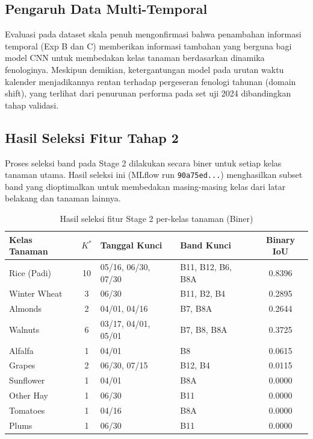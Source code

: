 \subsection{Pengaruh Data Multi-Temporal}

Evaluasi pada dataset skala penuh mengonfirmasi bahwa penambahan informasi temporal (Exp B dan C) 
memberikan informasi tambahan yang berguna bagi model CNN untuk membedakan kelas tanaman 
berdasarkan dinamika fenologinya. Meskipun demikian, ketergantungan model pada urutan waktu 
kalender menjadikannya rentan terhadap pergeseran fenologi tahunan (domain shift), yang 
terlihat dari penurunan performa pada set uji 2024 dibandingkan tahap validasi.

\subsection{Hasil Seleksi Fitur Tahap 2}

Proses seleksi band pada Stage 2 dilakukan secara biner untuk setiap kelas tanaman utama. 
Hasil seleksi ini (MLflow run \texttt{90a75ed...}) menghasilkan subset band yang dioptimalkan 
untuk membedakan masing-masing kelas dari latar belakang dan tanaman lainnya.

\begin{table}[H]
    \centering
    \caption{Hasil seleksi fitur Stage 2 per-kelas tanaman (Biner)}
    \label{tab:stage2_results}
    \begin{tabular}{|l|c|l|l|c|}
    \hline
    \textbf{Kelas Tanaman} & \textbf{$K^*$} & \textbf{Tanggal Kunci} & \textbf{Band Kunci} & \textbf{Binary IoU} \\
    \hline
    Rice (Padi)       & 10 & 05/16, 06/30, 07/30 & B11, B12, B6, B8A & 0.8396 \\
    Winter Wheat      & 3  & 06/30               & B11, B2, B4       & 0.2895 \\
    Almonds           & 2  & 04/01, 04/16        & B7, B8A           & 0.2644 \\
    Walnuts           & 6  & 03/17, 04/01, 05/01 & B7, B8, B8A       & 0.3725 \\
    Alfalfa           & 1  & 04/01               & B8                & 0.0615 \\
    Grapes            & 2  & 06/30, 07/15        & B12, B4           & 0.0115 \\
    Sunflower         & 1  & 04/01               & B8A               & 0.0000 \\
    Other Hay         & 1  & 06/30               & B11               & 0.0000 \\
    Tomatoes          & 1  & 04/16               & B8A               & 0.0000 \\
    Plums             & 1  & 06/30               & B11               & 0.0000 \\
    \hline
    \end{tabular}
\end{table}

